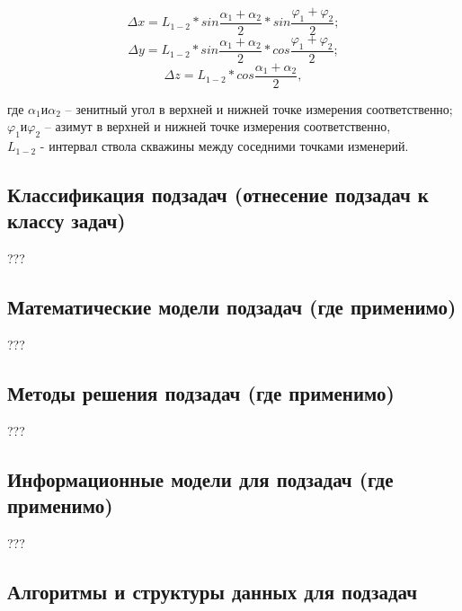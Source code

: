 $$ \Delta x = L_{1-2} * sin \frac{\alpha_1 + \alpha_2}{2} * sin \frac{\varphi_1 + \varphi_2}{2}; $$
$$ \Delta y = L_{1-2} * sin \frac{\alpha_1 + \alpha_2}{2} * cos \frac{\varphi_1 + \varphi_2}{2}; $$
$$ \Delta z = L_{1-2} * cos \frac{\alpha_1 + \alpha_2}{2}, $$

где $ \alpha_1 и \alpha_2 $ – зенитный угол в верхней и нижней точке измерения соответственно;\\
$ \varphi_1 и \varphi_2 $ – азимут в верхней и нижней точке измерения соответственно,\\
$ L_{1-2} $ - интервал ствола скважины между соседними точками изменерий.

\subsection{Классификация подзадач (отнесение подзадач к классу задач)}
???

\subsection{Математические модели подзадач (где применимо)}
???

\subsection{Методы решения подзадач (где применимо)}
???

\subsection{Информационные модели для подзадач (где применимо)}
???

\subsection{Алгоритмы и структуры данных для подзадач}
